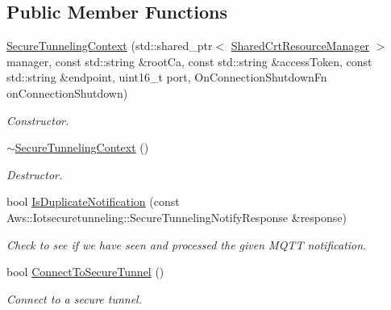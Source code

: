 \subsection*{Public Member Functions}
\begin{DoxyCompactItemize}
\item 
\hyperlink{class_aws_1_1_iot_1_1_device_client_1_1_secure_tunneling_1_1_secure_tunneling_context_a7619ca8a373c28c33a59615f69d6a2fc}{Secure\+Tunneling\+Context} (std\+::shared\+\_\+ptr$<$ \hyperlink{class_aws_1_1_iot_1_1_device_client_1_1_shared_crt_resource_manager}{Shared\+Crt\+Resource\+Manager} $>$ manager, const std\+::string \&root\+Ca, const std\+::string \&access\+Token, const std\+::string \&endpoint, uint16\+\_\+t port, On\+Connection\+Shutdown\+Fn on\+Connection\+Shutdown)
\begin{DoxyCompactList}\small\item\em Constructor. \end{DoxyCompactList}\item 
\mbox{\label{class_aws_1_1_iot_1_1_device_client_1_1_secure_tunneling_1_1_secure_tunneling_context_aa416f61064dda593184cedd86e16acbe}} 
\hyperlink{class_aws_1_1_iot_1_1_device_client_1_1_secure_tunneling_1_1_secure_tunneling_context_aa416f61064dda593184cedd86e16acbe}{$\sim$\+Secure\+Tunneling\+Context} ()
\begin{DoxyCompactList}\small\item\em Destructor. \end{DoxyCompactList}\item 
bool \hyperlink{class_aws_1_1_iot_1_1_device_client_1_1_secure_tunneling_1_1_secure_tunneling_context_a2903abce816d29356985d7a37cde728e}{Is\+Duplicate\+Notification} (const Aws\+::\+Iotsecuretunneling\+::\+Secure\+Tunneling\+Notify\+Response \&response)
\begin{DoxyCompactList}\small\item\em Check to see if we have seen and processed the given M\+Q\+TT notification. \end{DoxyCompactList}\item 
bool \hyperlink{class_aws_1_1_iot_1_1_device_client_1_1_secure_tunneling_1_1_secure_tunneling_context_a521c773c7019dc456922500627d241e8}{Connect\+To\+Secure\+Tunnel} ()
\begin{DoxyCompactList}\small\item\em Connect to a secure tunnel. \end{DoxyCompactList}\end{DoxyCompactItemize}
